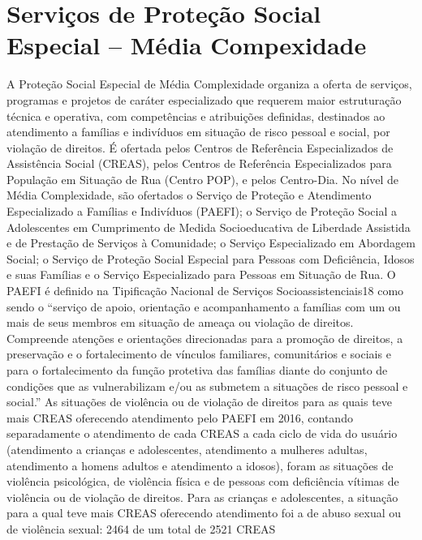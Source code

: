 \documentclass[
  brazilian]{report}
\begin{document}
\hypertarget{serviuxe7os-de-proteuxe7uxe3o-social-especial-muxe9dia-compexidade}{%
\section{Serviços de Proteção Social Especial -- Média
Compexidade}\label{serviuxe7os-de-proteuxe7uxe3o-social-especial-muxe9dia-compexidade}}

A Proteção Social Especial de Média Complexidade organiza a oferta de
serviços, programas e projetos de caráter especializado que requerem
maior estruturação técnica e operativa, com competências e atribuições
definidas, destinados ao atendimento a famílias e indivíduos em situação
de risco pessoal e social, por violação de direitos. É ofertada pelos
Centros de Referência Especializados de Assistência Social (CREAS),
pelos Centros de Referência Especializados para População em Situação de
Rua (Centro POP), e pelos Centro-Dia. No nível de Média Complexidade,
são ofertados o Serviço de Proteção e Atendimento Especializado a
Famílias e Indivíduos (PAEFI); o Serviço de Proteção Social a
Adolescentes em Cumprimento de Medida Socioeducativa de Liberdade
Assistida e de Prestação de Serviços à Comunidade; o Serviço
Especializado em Abordagem Social; o Serviço de Proteção Social Especial
para Pessoas com Deficiência, Idosos e suas Famílias e o Serviço
Especializado para Pessoas em Situação de Rua. O PAEFI é definido na
Tipificação Nacional de Serviços Socioassistenciais18 como sendo o
``serviço de apoio, orientação e acompanhamento a famílias com um ou
mais de seus membros em situação de ameaça ou violação de direitos.
Compreende atenções e orientações direcionadas para a promoção de
direitos, a preservação e o fortalecimento de vínculos familiares,
comunitários e sociais e para o fortalecimento da função protetiva das
famílias diante do conjunto de condições que as vulnerabilizam e/ou as
submetem a situações de risco pessoal e social.'' As situações de
violência ou de violação de direitos para as quais teve mais CREAS
oferecendo atendimento pelo PAEFI em 2016, contando separadamente o
atendimento de cada CREAS a cada ciclo de vida do usuário (atendimento a
crianças e adolescentes, atendimento a mulheres adultas, atendimento a
homens adultos e atendimento a idosos), foram as situações de violência
psicológica, de violência física e de pessoas com deficiência vítimas de
violência ou de violação de direitos. Para as crianças e adolescentes, a
situação para a qual teve mais CREAS oferecendo atendimento foi a de
abuso sexual ou de violência sexual: 2464 de um total de 2521 CREAS
\end{document}
